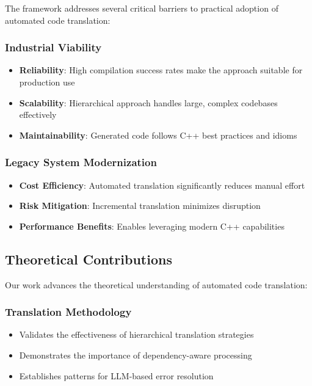 The framework addresses several critical barriers to practical adoption of automated code translation:

\subsubsection{Industrial Viability}
\begin{itemize}
\item \textbf{Reliability}: High compilation success rates make the approach suitable for production use
\item \textbf{Scalability}: Hierarchical approach handles large, complex codebases effectively
\item \textbf{Maintainability}: Generated code follows C++ best practices and idioms
\end{itemize}

\subsubsection{Legacy System Modernization}
\begin{itemize}
\item \textbf{Cost Efficiency}: Automated translation significantly reduces manual effort
\item \textbf{Risk Mitigation}: Incremental translation minimizes disruption
\item \textbf{Performance Benefits}: Enables leveraging modern C++ capabilities
\end{itemize}

\subsection{Theoretical Contributions}

Our work advances the theoretical understanding of automated code translation:

\subsubsection{Translation Methodology}
\begin{itemize}
\item Validates the effectiveness of hierarchical translation strategies
\item Demonstrates the importance of dependency-aware processing
\item Establishes patterns for LLM-based error resolution
\end{itemize}

